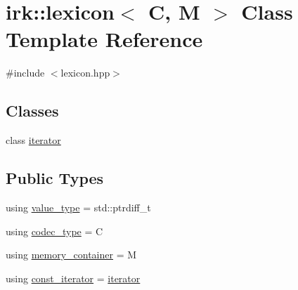 \hypertarget{classirk_1_1lexicon}{}\section{irk\+:\+:lexicon$<$ C, M $>$ Class Template Reference}
\label{classirk_1_1lexicon}


{\ttfamily \#include $<$lexicon.\+hpp$>$}

\subsection*{Classes}
\begin{DoxyCompactItemize}
\item 
class \mbox{\hyperlink{classirk_1_1lexicon_1_1iterator}{iterator}}
\end{DoxyCompactItemize}
\subsection*{Public Types}
\begin{DoxyCompactItemize}
\item 
using \mbox{\hyperlink{classirk_1_1lexicon_aeac00a0cdd67339d9d09783a1c930dd2}{value\+\_\+type}} = std\+::ptrdiff\+\_\+t
\item 
using \mbox{\hyperlink{classirk_1_1lexicon_a3ec38dbe131c7b0a9551d05ad619fc89}{codec\+\_\+type}} = C
\item 
using \mbox{\hyperlink{classirk_1_1lexicon_a2097b1f4bfc324504a9fe10af681b0be}{memory\+\_\+container}} = M
\item 
using \mbox{\hyperlink{classirk_1_1lexicon_a48b20b5f5a8375a0ba0e34526a6684ac}{const\+\_\+iterator}} = \mbox{\hyperlink{classirk_1_1lexicon_1_1iterator}{iterator}}
\end{DoxyCompactItemize}
